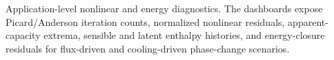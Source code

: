 \caption{Application-level nonlinear and energy diagnostics. The dashboards expose Picard/Anderson iteration counts, normalized nonlinear residuals, apparent-capacity extrema, sensible and latent enthalpy histories, and energy-closure residuals for flux-driven and cooling-driven phase-change scenarios.}
\label{fig:direction-c-diagnostics-gallery}
